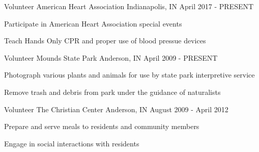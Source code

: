 

\begin{cventries}

  \cventry
    {Volunteer} %
    {American Heart Association} %
    {Indianapolis, IN} %
    {April 2017 - PRESENT} %
    {
      \begin{cvitems} %
        \item {Participate in American Heart Association special events}
        \item {Teach Hands Only CPR and proper use of blood pressue devices}
      \end{cvitems}
    }

  \cventry
    {Volunteer} %
    {Mounds State Park} %
    {Anderson, IN} %
    {April 2009 - PRESENT} %
    {
      \begin{cvitems} %
        \item {Photograph various plants and animals for use by state park interpretive service}
        \item {Remove trash and debris from park under the guidance of naturalists}
      \end{cvitems}
    }

  \cventry
    {Volunteer}
    {The Christian Center}
    {Anderson, IN}
    {August 2009 - April 2012}
    {
      \begin{cvitems}
        \item {Prepare and serve meals to residents and community members}
        \item {Engage in social interactions with residents}
      \end{cvitems}
    }
    


\end{cventries}
